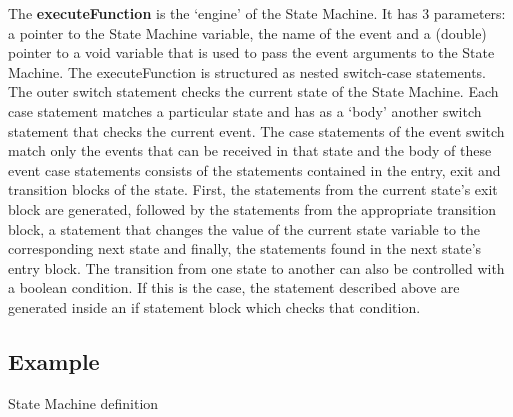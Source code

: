 \documentclass[a4paper,10pt,titlepage]{report}
\begin{document}
The \textbf{executeFunction} is the ‘engine’ of the State Machine. It has 3 parameters:  a pointer to the State Machine variable, the name of the event and a (double) pointer to a void variable that is used to pass the event arguments to the State Machine.
The executeFunction is structured as nested switch-case statements.
The outer switch statement checks the current state of the State Machine. Each case statement matches a particular state and has as a ‘body’ another switch statement that checks the current event. The case statements of the event switch match only the events  that can be received in that state and the body of these event case statements consists of the statements contained in the entry, exit and transition blocks of the state. First, the statements from the current state’s exit block are generated, followed by the statements from the appropriate transition block, a statement that changes the value of the current state variable to the corresponding next state and finally, the statements found in the next state’s entry block. 
The transition from one state to another can also be controlled with a boolean condition. If this is the case, the statement described above are generated inside an if statement block which checks that condition.

\newpage

\subsection{Example}
{\setlength{\parindent}{0cm}
State Machine definition
}
\end{document}
